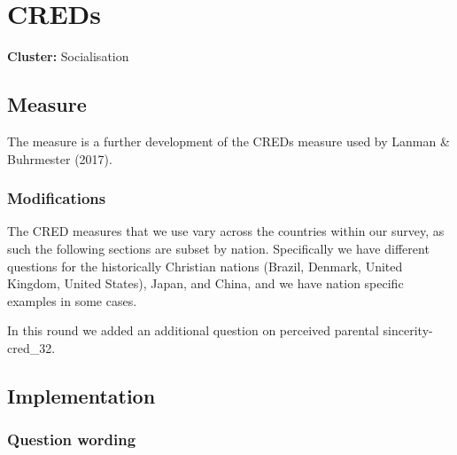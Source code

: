 \documentclass[
  letterpaper,
]{scrbook}
\begin{document}
\chapter{CREDs}\label{creds}

\textbf{Cluster:} Socialisation

\section{Measure}\label{measure-1}

The measure is a further development of the CREDs measure used by Lanman
\& Buhrmester (2017).

\subsection*{Modifications}\label{modifications-1}

The CRED measures that we use vary across the countries within our
survey, as such the following sections are subset by nation.
Specifically we have different questions for the historically Christian
nations (Brazil, Denmark, United Kingdom, United States), Japan, and
China, and we have nation specific examples in some cases.

In this round we added an additional question on perceived parental
sincerity- cred\_32.

\section{Implementation}\label{implementation-1}

\subsection*{Question wording}\label{question-wording-1}
\end{document}
